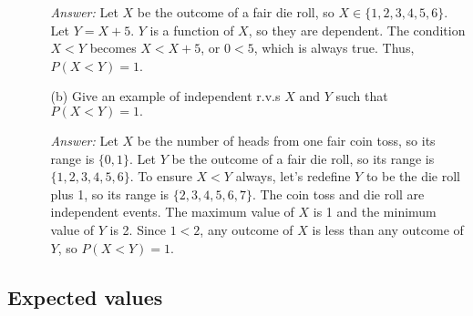 \documentclass{article}
\begin{document}
\begin{enumerate}
\begin{enumerate}
        \medskip
        \noindent \textit{Answer:}
        Let $X$ be the outcome of a fair die roll, so $X \in \{1, 2, 3, 4, 5, 6\}$. Let $Y = X + 5$. $Y$ is a function of $X$, so they are dependent. The condition $X < Y$ becomes $X < X+5$, or $0 < 5$, which is always true. Thus, $P(X<Y)=1$.
        
        \item[(b)] Give an example of independent r.v.s $X$ and $Y$ such that $P(X<Y)=1.$
        
        \medskip
        \noindent \textit{Answer:}
        Let $X$ be the number of heads from one fair coin toss, so its range is $\{0, 1\}$. Let $Y$ be the outcome of a fair die roll, so its range is $\{1, 2, 3, 4, 5, 6\}$. To ensure $X<Y$ always, let's redefine $Y$ to be the die roll plus 1, so its range is $\{2, 3, 4, 5, 6, 7\}$. The coin toss and die roll are independent events. The maximum value of $X$ is 1 and the minimum value of $Y$ is 2. Since $1<2$, any outcome of $X$ is less than any outcome of $Y$, so $P(X<Y)=1$.
    \end{enumerate}
\end{enumerate}

\newpage
\subsection*{Expected values}
\end{document}
